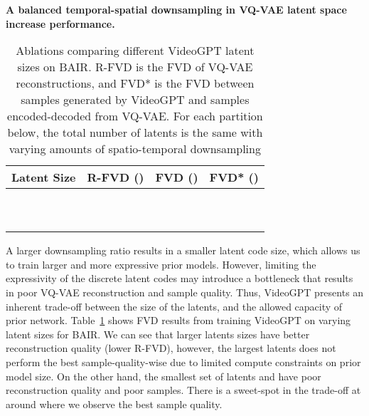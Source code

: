 \textbf{A balanced temporal-spatial downsampling in VQ-VAE latent space increase performance.}
\begin{table}[H]
\begin{minipage}{.5\textwidth}
\center
\caption{Ablations comparing different VideoGPT latent sizes on BAIR. R-FVD is the FVD of VQ-VAE reconstructions, and FVD* is the FVD between samples generated by VideoGPT and samples encoded-decoded from VQ-VAE. For each partition below, the total number of latents is the same with varying amounts of spatio-temporal downsampling}
\label{table:abl_latent_size}
\begin{tabular}{@{}cccc@{}}
\toprule
Latent Size                      & R-FVD () & FVD ()       & FVD* ()     \\ \midrule
          &                &           &           \\
            &               &           &           \\ \midrule
            &                &           &           \\ \midrule
          &                &           &           \\
          &                &           &           \\
         &                &           &           \\ \midrule
          &                &           &          \\
 &       &  &  \\ \midrule
          &                &           &          \\
         &                &           &          \\ \bottomrule
\end{tabular}
\end{minipage}

\end{table}

A larger downsampling ratio results in a smaller latent code size, which allows us to train larger and more expressive prior models. However, limiting the expressivity of the discrete latent codes may introduce a bottleneck that results in poor VQ-VAE reconstruction and sample quality. Thus, VideoGPT presents an inherent trade-off between the size of the latents, and the allowed capacity of prior network. Table~\ref{table:abl_latent_size} shows FVD results from training VideoGPT on varying latent sizes for BAIR. We can see that larger latents sizes have better reconstruction quality (lower R-FVD), however, the largest latents  does not perform the best sample-quality-wise due to limited compute constraints on prior model size. On the other hand, the smallest set of latents  and  have poor reconstruction quality and poor samples. There is a sweet-spot in the trade-off at around  where we observe the best sample quality.

